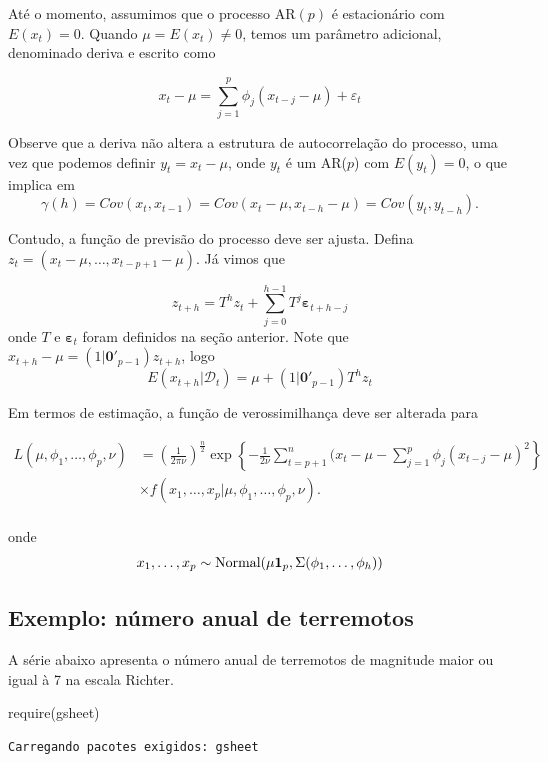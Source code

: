 \documentclass[
  letterpaper,
  DIV=11,
  numbers=noendperiod]{scrartcl}
\newenvironment{Shaded}{\begin{snugshade}}{\end{snugshade}}
\newcommand{\FunctionTok}[1]{\textcolor[rgb]{0.28,0.35,0.67}{#1}}
\newcommand{\NormalTok}[1]{\textcolor[rgb]{0.00,0.23,0.31}{#1}}
\theoremstyle{definition}
\theoremstyle{definition}
\theoremstyle{plain}
\theoremstyle{plain}
\theoremstyle{remark}
\begin{document}
Até o momento, assumimos que o processo AR\((p)\) é estacionário com
\(E(x_t)=0\). Quando \(\mu=E(x_t)\neq 0\), temos um parâmetro adicional,
denominado deriva e escrito como

\[x_t-\mu=\sum_{j=1}^p \phi_j(x_{t-j}-\mu)+\varepsilon_t\]

Observe que a deriva não altera a estrutura de autocorrelação do
processo, uma vez que podemos definir \(y_t=x_t-\mu\), onde \(y_t\) é um
AR(\(p\)) com \(E(y_t)=0\), o que implica em
\[\gamma(h)=Cov(x_t, x_{t-1})=Cov(x_t-\mu,x_{t-h}-\mu)=Cov(y_t,y_{t-h}).\]

Contudo, a função de previsão do processo deve ser ajusta. Defina
\(z_t=(x_t-\mu,\ldots,x_{t-p+1}-\mu)\). Já vimos que

\[z_{t+h}=T^h z_t+\sum_{j=0}^{h-1}T^j\boldsymbol{\varepsilon}_{t+h-j}\]
onde \(T\) e \(\boldsymbol{\varepsilon}_t\) foram definidos na seção
anterior. Note que \(x_{t+h}-\mu=(1|\textbf{0}'_{p-1})z_{t+h}\), logo
\[E(x_{t+h}|\mathcal{D}_t)=\mu+(1|\textbf{0}'_{p-1})T^h z_t\]

Em termos de estimação, a função de verossimilhança deve ser alterada
para

\begin{align*}
L(\mu,\phi_1,\ldots,\phi_p,\nu)&=\left(\frac{1}{2\pi\nu}\right)^{\frac{n}{2}}\exp\left\{-\frac{1}{2\nu}\sum_{t=p+1}^n(x_t-\mu-\sum_{j=1}^p \phi_j(x_{t-j}-\mu)^2\right\} \\&\times f(x_{1},\ldots,x_p|\mu,\phi_1,\ldots,\phi_p,\nu).
        \end{align*}\\
onde
\[x_{1},\ldots,x_p\sim\hbox{Normal}(\mu\textbf{1}_p,\Sigma(\phi_1,\ldots,\phi_h))\]

\subsection{Exemplo: número anual de
terremotos}\label{exemplo-nuxfamero-anual-de-terremotos}

A série abaixo apresenta o número anual de terremotos de magnitude maior
ou igual à 7 na escala Richter.

\begin{Shaded}
\begin{Highlighting}[]
\FunctionTok{require}\NormalTok{(gsheet)}
\end{Highlighting}
\end{Shaded}

\begin{verbatim}
Carregando pacotes exigidos: gsheet
\end{verbatim}
\end{document}
